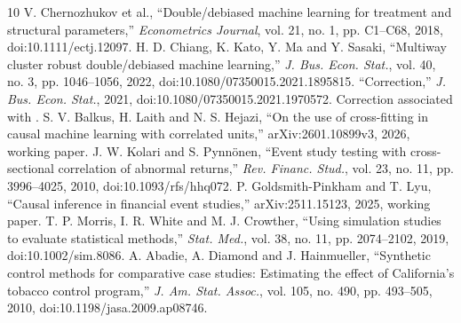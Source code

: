 \documentclass[conference]{IEEEtran}
\begin{document}
\begin{thebibliography}{10}
 V. Chernozhukov et al., ``Double/debiased machine learning for treatment and structural parameters,'' \emph{Econometrics Journal}, vol. 21, no. 1, pp. C1--C68, 2018, doi:10.1111/ectj.12097.
 H. D. Chiang, K. Kato, Y. Ma and Y. Sasaki, ``Multiway cluster robust double/debiased machine learning,'' \emph{J. Bus. Econ. Stat.}, vol. 40, no. 3, pp. 1046--1056, 2022, doi:10.1080/07350015.2021.1895815.
 ``Correction,'' \emph{J. Bus. Econ. Stat.}, 2021, doi:10.1080/07350015.2021.1970572. Correction associated with \cite{multiway}.
 S. V. Balkus, H. Laith and N. S. Hejazi, ``On the use of cross-fitting in causal machine learning with correlated units,'' arXiv:2601.10899v3, 2026, working paper.
 J. W. Kolari and S. Pynn\"onen, ``Event study testing with cross-sectional correlation of abnormal returns,'' \emph{Rev. Financ. Stud.}, vol. 23, no. 11, pp. 3996--4025, 2010, doi:10.1093/rfs/hhq072.
 P. Goldsmith-Pinkham and T. Lyu, ``Causal inference in financial event studies,'' arXiv:2511.15123, 2025, working paper.
 T. P. Morris, I. R. White and M. J. Crowther, ``Using simulation studies to evaluate statistical methods,'' \emph{Stat. Med.}, vol. 38, no. 11, pp. 2074--2102, 2019, doi:10.1002/sim.8086.
 A. Abadie, A. Diamond and J. Hainmueller, ``Synthetic control methods for comparative case studies: Estimating the effect of California's tobacco control program,'' \emph{J. Am. Stat. Assoc.}, vol. 105, no. 490, pp. 493--505, 2010, doi:10.1198/jasa.2009.ap08746.
\end{thebibliography}
\end{document}
